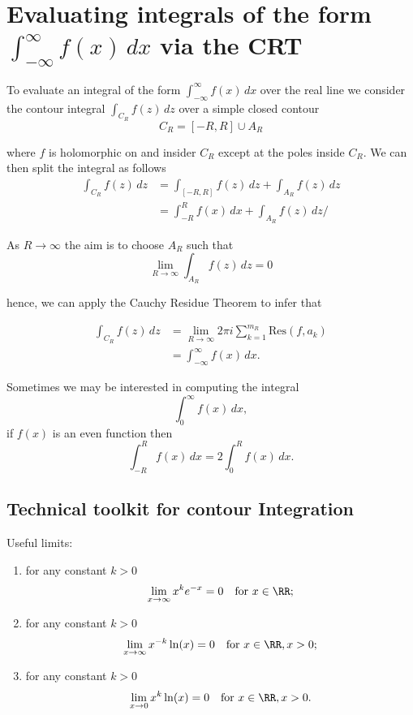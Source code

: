 \documentclass[12pt, a4paper]{article}
\begin{document}
\section{Evaluating integrals of the form \texorpdfstring{\(\int_{-\infty}^{\infty} f(x) \, dx\)}{TEXT} via the CRT}

To evaluate an integral of the form \(\int_{-\infty}^{\infty} f(x) \, dx\) over the real line we consider the contour integral \(\int_{C_R} f(z) \, dz\) over a simple closed contour 
\[C_R = [-R,R] \cup A_R\]

where \(f\) is holomorphic on and insider \(C_R\) except  at the poles inside \(C_R\). We can then split the integral as follows 
\[\begin{aligned}
    \int_{C_R} f(z) \, dz &= \int_{[-R,R]} f(z) \, dz + \int_{A_R} f(z) \, dz \\
    &= \int_{-R}^R f(x) \, dx + \int_{A_R} f(z) \, dz/
\end{aligned}\]

As \(R \to \infty\) the aim is to choose \(A_R\) such that 
\[\lim_{R \to \infty} \int_{A_R} f(z) \, dz = 0\]

hence, we can apply the Cauchy Residue Theorem to infer that 

\[\begin{aligned}
    \int_{C_R} f(z) \, dz &= \lim_{R\to\infty} 2\pi i \sum_{k=1}^{m_R} \text{Res}(f,a_k) \\
    &= \int_{-\infty}^{\infty} f(x) \, dx.
\end{aligned}\]

\begin{mdnote}
    Sometimes we may be interested in computing the integral 
    \[\int_{0}^{\infty} f(x) \, dx,\]
    if \(f(x)\) is an even function then 
    \[\int_{-R}^{R} f(x) \, dx = 2\int_{0}^{R} f(x) \, dx.\]
\end{mdnote}


\subsection{Technical toolkit for contour Integration}

\begin{proposition}
    Useful limits:
    \begin{enumerate}
        \item for any constant \(k>0\)
        \[\lim_{x \to \infty} x^k e^{-x} =0 \quad \text{for } x\in \RR;\]
        \item for any constant \(k>0\)
        \[\lim_{x \to \infty} x^{-k} \ln(x)=0 \quad \text{for } x\in \RR,x>0;\]
        \item for any constant \(k>0\)
        \[\lim_{x \to 0} x^k \ln(x) =0 \quad \text{for } x\in \RR,x>0.\]
    \end{enumerate}
\end{proposition}
\end{document}
